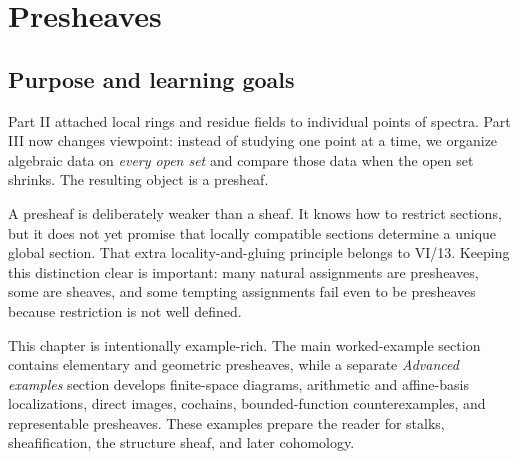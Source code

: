 
\chapter{Presheaves}
\label{ch:presheaves}
\providecommand{\id}{\operatorname{id}}
\providecommand{\Hom}{\operatorname{Hom}}

\section*{Purpose and learning goals}

Part II attached local rings and residue fields to individual points of spectra.  Part III now
changes viewpoint: instead of studying one point at a time, we organize algebraic data on
\emph{every open set} and compare those data when the open set shrinks.  The resulting
object is a presheaf.

A presheaf is deliberately weaker than a sheaf.  It knows how to restrict sections, but it
does not yet promise that locally compatible sections determine a unique global section.
That extra locality-and-gluing principle belongs to VI/13.  Keeping this distinction clear is
important: many natural assignments are presheaves, some are sheaves, and some tempting
assignments fail even to be presheaves because restriction is not well defined.

This chapter is intentionally example-rich.  The main worked-example section contains
elementary and geometric presheaves, while a separate \emph{Advanced examples} section
develops finite-space diagrams, arithmetic and affine-basis localizations, direct images,
cochains, bounded-function counterexamples, and representable presheaves.  These examples
prepare the reader for stalks, sheafification, the structure sheaf, and later cohomology.

